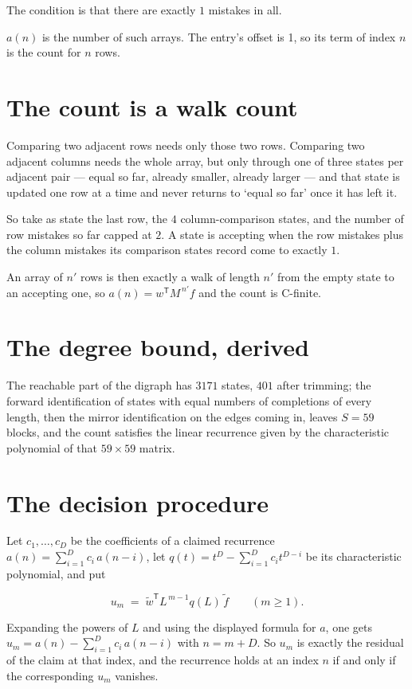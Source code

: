 \documentclass[11pt]{article}
\theoremstyle{definition}
\begin{document}
The condition is that there are exactly $1$ mistakes in all.

$a(n)$ is the number of such arrays. The entry's offset is 1, so its term of index $n$ is the count for $n$ rows.

\section{The count is a walk count}

Comparing two adjacent rows needs only those two rows. Comparing two adjacent columns needs the whole array, but only through one of three states per adjacent pair --- equal so far, already smaller, already larger --- and that state is updated one row at a time and never returns to `equal so far' once it has left it.

So take as state the last row, the $4$ column-comparison states, and the number of row mistakes so far capped at $2$. A state is accepting when the row mistakes plus the column mistakes its comparison states record come to exactly $1$.

An array of $n'$ rows is then exactly a walk of length $n'$ from the empty state to an accepting one, so $a(n) = w^{\mathsf T}M^{\,n'}f$ and the count is C-finite.

\section{The degree bound, derived}

The reachable part of the digraph has $3171$ states, $401$ after trimming; the forward identification of states with equal numbers of completions of every length, then the mirror identification on the edges coming in, leaves $S = 59$ blocks, and the count satisfies the linear recurrence given by the characteristic polynomial of that $59\times59$ matrix.

\section{The decision procedure}

Let $c_1,\dots,c_D$ be the coefficients of a claimed recurrence $a(n) = \sum_{i=1}^{D} c_i\,a(n-i)$, let $q(t) = t^{D} - \sum_{i=1}^{D} c_i t^{D-i}$ be its characteristic polynomial, and put

\[u_m \;=\; \tilde w^{\mathsf T} L^{\,m-1} q(L)\,\tilde f \qquad (m \ge 1).\]

Expanding the powers of $L$ and using the displayed formula for $a$, one gets $u_m = a(n) - \sum_{i=1}^{D} c_i\,a(n-i)$ with $n = m + D$. So $u_m$ is exactly the residual of the claim at that index, and the recurrence holds at an index $n$ if and only if the corresponding $u_m$ vanishes.
\end{document}
